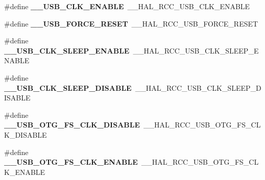 \begin{DoxyCompactItemize}
\item 
\#define {\bfseries \+\_\+\+\_\+\+U\+S\+B\+\_\+\+C\+L\+K\+\_\+\+E\+N\+A\+B\+LE}~\+\_\+\+\_\+\+H\+A\+L\+\_\+\+R\+C\+C\+\_\+\+U\+S\+B\+\_\+\+C\+L\+K\+\_\+\+E\+N\+A\+B\+LE\hypertarget{group___h_a_l___r_c_c___aliased_gaf24171e66b567b30d1ecb05bf218043f}{}\label{group___h_a_l___r_c_c___aliased_gaf24171e66b567b30d1ecb05bf218043f}

\item 
\#define {\bfseries \+\_\+\+\_\+\+U\+S\+B\+\_\+\+F\+O\+R\+C\+E\+\_\+\+R\+E\+S\+ET}~\+\_\+\+\_\+\+H\+A\+L\+\_\+\+R\+C\+C\+\_\+\+U\+S\+B\+\_\+\+F\+O\+R\+C\+E\+\_\+\+R\+E\+S\+ET\hypertarget{group___h_a_l___r_c_c___aliased_ga24aaba01becfa624ec6e3b0ea8890615}{}\label{group___h_a_l___r_c_c___aliased_ga24aaba01becfa624ec6e3b0ea8890615}

\item 
\#define {\bfseries \+\_\+\+\_\+\+U\+S\+B\+\_\+\+C\+L\+K\+\_\+\+S\+L\+E\+E\+P\+\_\+\+E\+N\+A\+B\+LE}~\+\_\+\+\_\+\+H\+A\+L\+\_\+\+R\+C\+C\+\_\+\+U\+S\+B\+\_\+\+C\+L\+K\+\_\+\+S\+L\+E\+E\+P\+\_\+\+E\+N\+A\+B\+LE\hypertarget{group___h_a_l___r_c_c___aliased_ga8bdfc42836049dfac32f91b006c16592}{}\label{group___h_a_l___r_c_c___aliased_ga8bdfc42836049dfac32f91b006c16592}

\item 
\#define {\bfseries \+\_\+\+\_\+\+U\+S\+B\+\_\+\+C\+L\+K\+\_\+\+S\+L\+E\+E\+P\+\_\+\+D\+I\+S\+A\+B\+LE}~\+\_\+\+\_\+\+H\+A\+L\+\_\+\+R\+C\+C\+\_\+\+U\+S\+B\+\_\+\+C\+L\+K\+\_\+\+S\+L\+E\+E\+P\+\_\+\+D\+I\+S\+A\+B\+LE\hypertarget{group___h_a_l___r_c_c___aliased_gaf172450b93f91a70d86ad5afed46b933}{}\label{group___h_a_l___r_c_c___aliased_gaf172450b93f91a70d86ad5afed46b933}

\item 
\#define {\bfseries \+\_\+\+\_\+\+U\+S\+B\+\_\+\+O\+T\+G\+\_\+\+F\+S\+\_\+\+C\+L\+K\+\_\+\+D\+I\+S\+A\+B\+LE}~\+\_\+\+\_\+\+H\+A\+L\+\_\+\+R\+C\+C\+\_\+\+U\+S\+B\+\_\+\+O\+T\+G\+\_\+\+F\+S\+\_\+\+C\+L\+K\+\_\+\+D\+I\+S\+A\+B\+LE\hypertarget{group___h_a_l___r_c_c___aliased_gae40dc64569aaca471dff7a6547f11abe}{}\label{group___h_a_l___r_c_c___aliased_gae40dc64569aaca471dff7a6547f11abe}

\item 
\#define {\bfseries \+\_\+\+\_\+\+U\+S\+B\+\_\+\+O\+T\+G\+\_\+\+F\+S\+\_\+\+C\+L\+K\+\_\+\+E\+N\+A\+B\+LE}~\+\_\+\+\_\+\+H\+A\+L\+\_\+\+R\+C\+C\+\_\+\+U\+S\+B\+\_\+\+O\+T\+G\+\_\+\+F\+S\+\_\+\+C\+L\+K\+\_\+\+E\+N\+A\+B\+LE\hypertarget{group___h_a_l___r_c_c___aliased_gaf4dca51b5f2f6a142fdffc063f68787f}{}\label{group___h_a_l___r_c_c___aliased_gaf4dca51b5f2f6a142fdffc063f68787f}


\end{DoxyCompactItemize}
